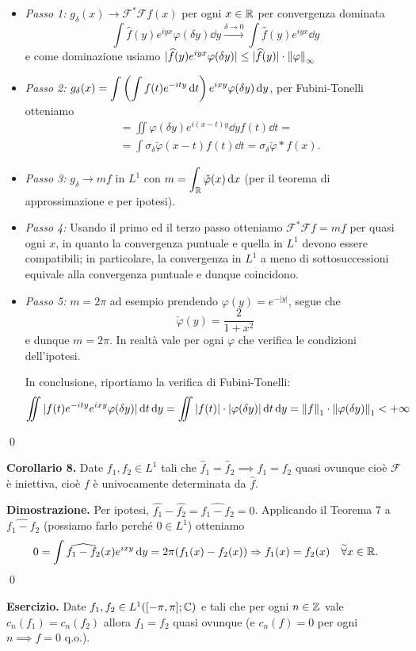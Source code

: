 \begin{itemize}
	\item \textit{Passo 1:}
		$g_\delta(x) \to \mathcal F^* \mathcal F f(x)$ per ogni $x \in \mathbb R$ per convergenza dominata
		$$
		\int \hat f(y) e^{iyx} \varphi(\delta y) \dd y \xrightarrow{\delta \to 0} 
		\int \hat f(y) e^{iyx} \dd y
		$$
		e come dominazione usiamo $|\widehat f(y) e^{iyx} \varphi(\delta y)| \leq |\widehat f(y)| \cdot \left\lVert \varphi \right\rVert_\infty$

	\item \textit{Passo 2:}
		$\displaystyle g_\delta(x) = \int \left( \int f(t) e^{-ity} \,\mathrm{d} t \right) e^{ixy} \varphi(\delta y) \,\mathrm{d} y$, per Fubini-Tonelli otteniamo
			$$
			\begin{aligned}
				&= \iint \varphi(\delta y) e^{i(x-t)y} \dd y f(t) \dd t = \\
				&= \int \sigma_\delta \check \varphi(x - t) f(t) \dd t = \sigma_\delta \check \varphi \ast f(x).
			\end{aligned}
			$$
	\item \textit{Passo 3:}
		$g_\delta \to m f$ in $L^1$ con $\displaystyle m = \int_\mathbb R \check \varphi(x) \,\mathrm{d} x$ (per il teorema di approssimazione e per ipotesi).

	\item \textit{Passo 4:}
		Usando il primo ed il terzo passo otteniamo $\mathcal F^* \mathcal F f = m f$ per quasi ogni $x$, in quanto la convergenza puntuale e quella in $L^1$ devono essere compatibili; in particolare, la convergenza in $L^1$ a meno di sottosuccessioni equivale alla convergenza puntuale e dunque coincidono.

	\item \textit{Passo 5:}
		$m = 2\pi$ ad esempio prendendo $\varphi(y) = e^{-|y|}$, segue che
		$$
		\check \varphi(y) = \frac{2}{1 + x^2}
		$$
		e dunque $m = 2\pi$. In realtà vale per ogni $\varphi$ che verifica le condizioni dell'ipotesi.

		\vs

		In conclusione, riportiamo la verifica di Fubini-Tonelli:
		$$
		\iint |f(t) e^{-ity} e^{ixy} \varphi(\delta y)| \,\mathrm{d} t \,\mathrm{d} y = \iint |f(t)| \cdot |\varphi(\delta y)| \,\mathrm{d} t \,\mathrm{d} y = \left\lVert f \right\rVert_1 \cdot \left\lVert \varphi(\delta y) \right\rVert_1 < +\infty
		$$
\end{itemize}
\qed

\textbf{Corollario 8.}
Date $f_1, f_2 \in L^1$ tali che $\hat f_1 = \hat f_2 \implies f_1 = f_2$ quasi ovunque cioè $\mathcal F$ è iniettiva, cioè $f$ è univocamente determinata da $\hat f$.

\textbf{Dimostrazione.} Per ipotesi, $\hat{f_1} - \hat{f_2} = \hat{f_1 - f_2} = 0$.
Applicando il Teorema 7 a $\hat{f_1 - f_2}$ (possiamo farlo perché $0 \in L^1$) otteniamo
%
$$
	0 = \int \widehat{f_1 - f_2}(x) e^{ixy} \,\mathrm{d} y = 2\pi (f_1(x) - f_2(x)) 
	\Rightarrow f_1(x) = f_2(x) \quad \widetilde\forall x \in \mathbb R.
$$
%
\qed


\textbf{Esercizio.}
Date $f_1, f_2 \in L^1([-\pi, \pi]; \mathbb C)$ e tali che per ogni $n \in \mathbb Z$ vale $c_n(f_1) = c_n(f_2)$ allora $f_1 = f_2$ quasi ovunque (e $c_n(f) = 0$ per ogni $n \implies f = 0$ q.o.).









